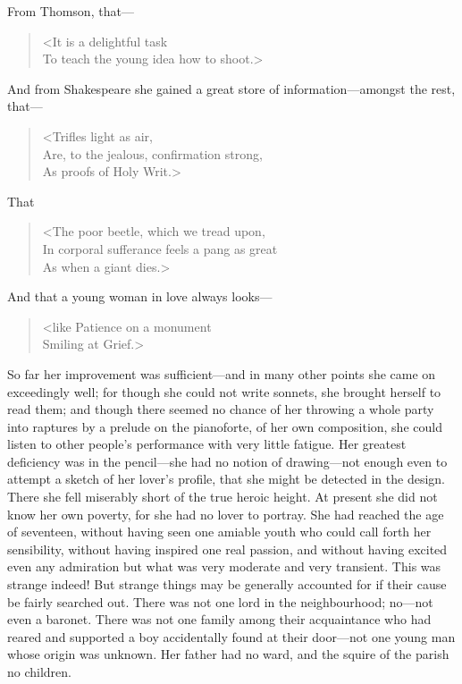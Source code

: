  From Thomson, that— 
 \begin{verse}
 <It is a delightful task\\
 To teach the young idea how to shoot.>
 \end{verse}

 And from Shakespeare she gained a great store of information—amongst the rest, that— 
 
 \begin{verse}
<Trifles light as air,\\
 Are, to the jealous, confirmation strong,\\
 As proofs of Holy Writ.>
 \end{verse}

 That 
 \begin{verse}
<The poor beetle, which we tread upon,\\
In corporal sufferance feels a pang as great\\
As when a giant dies.>
\end{verse}

 And that a young woman in love always looks— 
 \begin{verse}
 <like Patience on a monument\\
 Smiling at Grief.> 
\end{verse}

 So far her improvement was sufficient—and in many other points she came on exceedingly well; for though she could not write sonnets, she brought herself to read them; and though there seemed no chance of her throwing a whole party into raptures by a prelude on the pianoforte, of her own composition, she could listen to other people's performance with very little fatigue. Her greatest deficiency was in the pencil—she had no notion of drawing—not enough even to attempt a sketch of her lover's profile, that she might be detected in the design. There she fell miserably short of the true heroic height. At present she did not know her own poverty, for she had no lover to portray. She had reached the age of seventeen, without having seen one amiable youth who could call forth her sensibility, without having inspired one real passion, and without having excited even any admiration but what was very moderate and very transient. This was strange indeed! But strange things may be generally accounted for if their cause be fairly searched out. There was not one lord in the neighbourhood; no—not even a baronet. There was not one family among their acquaintance who had reared and supported a boy accidentally found at their door—not one young man whose origin was unknown. Her father had no ward, and the squire of the parish no children. 

